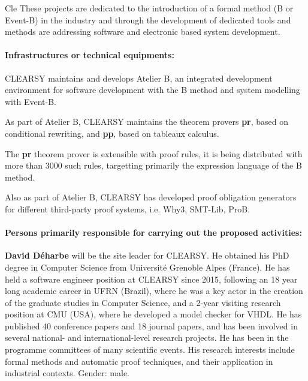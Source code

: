 \begin{sitedescription}{Cle}
These projects are dedicated to the introduction of a formal method (B or Event-B) in the industry and through the development
of dedicated tools and methods are addressing software and electronic based system development.

\paragraph*{Infrastructures or technical equipments:}

\begin{compactitem}
\item CLEARSY maintains and develops Atelier B, an integrated development environment for software development with the B method and system modelling with Event-B.
\item As part of Atelier B, CLEARSY maintains the theorem provers \textbf{pr}, based on conditional rewriting, and \textbf{pp}, based on tableaux calculus.
\item The \textbf{pr} theorem prover is extensible with proof rules, it is being distributed with more than 3000 such rules, targetting primarily the expression language of the B method.
\item Also as part of Atelier B, CLEARSY has developed proof obligation generators for different third-party proof systems, i.e. Why3, SMT-Lib, ProB.
\end{compactitem}

\paragraph*{Persons primarily responsible for carrying out the proposed activities:}

\begin{compactitem}
\item\textbf{David Déharbe} will be the site leader for CLEARSY. He obtained his PhD degree in Computer Science from Université Grenoble Alpes 
(France). He has held a software engineer position at CLEARSY since 2015, following an 18 year long academic career in UFRN (Brazil), 
where he was a key actor in the creation of the graduate studies in Computer Science, and a 2-year visiting research position at CMU 
(USA), where he developed a model checker for VHDL. He has published 40 conference papers and 18 journal papers, and has been involved 
in several national- and international-level research projects. He has been in the programme committees of many scientific events. His 
research interests include formal methods and automatic proof techniques, and their application in industrial contexts. Gender: male.


\end{compactitem}
\end{sitedescription}
